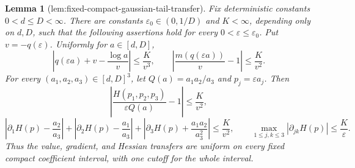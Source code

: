 \documentclass{article}
\newtheorem{lemma}{Lemma}
\begin{document}
\begin{lemma}[lem:fixed-compact-gaussian-tail-transfer]\label{lem:fixed-compact-gaussian-tail-transfer}
Fix deterministic constants \(0<d\leq D<\infty\). There are constants \(\varepsilon _0\in(0,1/D)\) and \(K<\infty\), depending only on \(d,D\), such that the following assertions hold for every \(0<\varepsilon\leq\varepsilon _0\). Put \(v=-q(\varepsilon)\). Uniformly for \(a\in[d,D]\),
\[
 \left|q(\varepsilon a)+v-\frac{\log a}{v}\right|
 \leq \frac{K}{v^3},
 \qquad
 \left|\frac{m(q(\varepsilon a))}{v}-1\right|
 \leq \frac{K}{v^2}.
\]
For every \((a_1,a_2,a_3)\in[d,D]^3\), let \(Q(a)=a_1a_2/a_3\) and \(p_j=\varepsilon a_j\). Then
\[
 \left|\frac{H(p_1,p_2,p_3)}{\varepsilon Q(a)}-1\right|
 \leq\frac{K}{v^2},
\]
\[
 \left|\partial_1H(p)-\frac{a_2}{a_3}\right|
 +\left|\partial_2H(p)-\frac{a_1}{a_3}\right|
 +\left|\partial_3H(p)+\frac{a_1a_2}{a_3^2}\right|
 \leq\frac{K}{v^2},
 \qquad
 \max_{1\leq j,k\leq3}|\partial_{jk}H(p)|\leq\frac{K}{\varepsilon}.
\]
Thus the value, gradient, and Hessian transfers are uniform on every fixed compact coefficient interval, with one cutoff for the whole interval.
\end{lemma}
\end{document}
